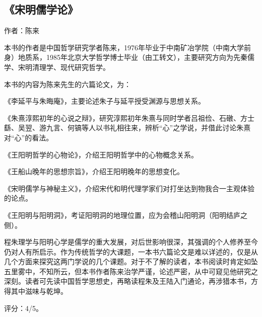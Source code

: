 \subsection{《宋明儒学论》}

作者：陈来

本书的作者是中国哲学研究学者陈来，1976年毕业于中南矿冶学院（中南大学前身）地质系，1985年北京大学哲学博士毕业（由工转文），主要研究方向为先秦儒学、宋明清理学、现代研究哲学。

本书的内容为陈来先生的六篇论文，为：
\begin{enumerate*}
	\item 《李延平与朱晦庵》，主要论述朱子与延平授受渊源与思想关系。
	\item 《朱熹淳熙初年的心说之辩》，研究淳熙初年朱熹与同时学者吕祖俭、石礅、方士繇、吴翌、游九言、何镐等人以书礼相往来，辨析“心”之学说，并借此讨论朱熹对“心”的看法。
	\item 《王阳明哲学的心物论》，介绍王阳明哲学中的心物概念关系。
	\item 《王船山晚年的思想宗旨》，介绍王阳明晚年的思想变化。
	\item 《宋明儒学与神秘主义》，介绍宋代和明代理学家们对打坐达到物我合一主观体验的论点。
	\item 《王阳明与阳明洞》，考证阳明洞的地理位置，应为会稽山阳明洞（阳明结庐之侧）。
\end{enumerate*}

程朱理学与阳明心学是儒学的重大发展，对后世影响很深，其强调的个人修养至今仍对人有所启示。作为传统哲学的大课题，一本书六篇论文是难以详述的，仅是从几个方面来探究这两门学说的几个课题。对于不了解的读者，本书阅读时肯定如坠五里雾中，不知所云，但本书作者陈来治学严谨，论述严密，从中可窥见他研究之深刻。读者可先读中国哲学思想史，再略读程朱及王陆入门通论，再涉猎本书，方得其中滋味与乾坤。

评分：4/5。